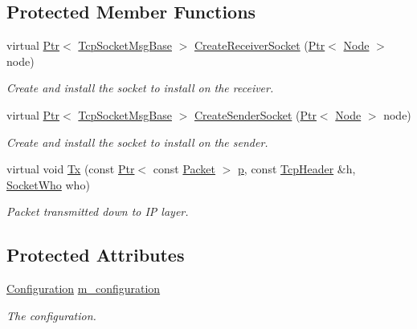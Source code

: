 \subsection*{Protected Member Functions}
\begin{DoxyCompactItemize}
\item 
virtual \hyperlink{classns3_1_1Ptr}{Ptr}$<$ \hyperlink{classns3_1_1TcpSocketMsgBase}{Tcp\+Socket\+Msg\+Base} $>$ \hyperlink{classSackPermittedTestCase_a841608094c8c4d7be080657e94049cd9}{Create\+Receiver\+Socket} (\hyperlink{classns3_1_1Ptr}{Ptr}$<$ \hyperlink{classns3_1_1Node}{Node} $>$ node)
\begin{DoxyCompactList}\small\item\em Create and install the socket to install on the receiver. \end{DoxyCompactList}\item 
virtual \hyperlink{classns3_1_1Ptr}{Ptr}$<$ \hyperlink{classns3_1_1TcpSocketMsgBase}{Tcp\+Socket\+Msg\+Base} $>$ \hyperlink{classSackPermittedTestCase_af9d0ae684dd5c81dcac425f7f48128bf}{Create\+Sender\+Socket} (\hyperlink{classns3_1_1Ptr}{Ptr}$<$ \hyperlink{classns3_1_1Node}{Node} $>$ node)
\begin{DoxyCompactList}\small\item\em Create and install the socket to install on the sender. \end{DoxyCompactList}\item 
virtual void \hyperlink{classSackPermittedTestCase_a1717f1215597e6f646188cdfbee00747}{Tx} (const \hyperlink{classns3_1_1Ptr}{Ptr}$<$ const \hyperlink{classns3_1_1Packet}{Packet} $>$ \hyperlink{lte__link__budget__x2__handover__measures_8m_ac9de518908a968428863f829398a4e62}{p}, const \hyperlink{classns3_1_1TcpHeader}{Tcp\+Header} \&h, \hyperlink{classns3_1_1TcpGeneralTest_a29338e6b7137cad650c2ff835713f6ee}{Socket\+Who} who)
\begin{DoxyCompactList}\small\item\em Packet transmitted down to IP layer. \end{DoxyCompactList}\end{DoxyCompactItemize}
\subsection*{Protected Attributes}
\begin{DoxyCompactItemize}
\item 
\hyperlink{classSackPermittedTestCase_a2dc95ae5e965bc36df7ea84c64723493}{Configuration} \hyperlink{classSackPermittedTestCase_aff7ae43e44e4fb3f7286e9d3083f2732}{m\+\_\+configuration}
\begin{DoxyCompactList}\small\item\em The configuration. \end{DoxyCompactList}\end{DoxyCompactItemize}


